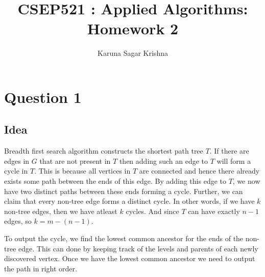 \documentclass{article}
\title{CSEP521 : Applied Algorithms: Homework 2}
\author{Karuna Sagar Krishna}
\begin{document}
    \maketitle

    \section*{Question 1}

    \subsection*{Idea}
    Breadth first search algorithm constructs the shortest path tree $T$. If there are edges in $G$ that are not present in $T$ then adding such an edge to $T$ will form a cycle in $T$. This is because all vertices in $T$ are connected and hence there already exists some path between the ends of this edge. By adding this edge to $T$, we now have two distinct paths between these ends forming a cycle. Further, we can claim that every non-tree edge forms a distinct cycle. In other words, if we have $k$ non-tree edges, then we have atleast $k$ cycles. And since $T$ can have exactly $n-1$ edges, so $k=m-(n-1)$.

    To output the cycle, we find the lowest common ancestor for the ends of the non-tree edge. This can done by keeping track of the levels and parents of each newly discovered vertex. Once we have the lowest common ancestor we need to output the path in right order.
\end{document}
